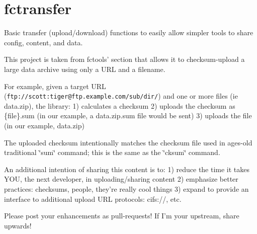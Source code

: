 \section*{fctransfer }

Basic transfer (upload/download) functions to easily allow simpler tools to share config, content, and data.

This project is taken from fctools' section that allows it to checksum-\/upload a large data archive using only a U\-R\-L and a filename.

For example, given a target U\-R\-L ({\tt ftp\-://scott\-:tiger@ftp.\-example.\-com/sub/dir/}) and one or more files (ie data.\-zip), the library\-: 1) calculates a checksum 2) uploads the checksum as \{file\}.sum (in our example, a data.\-zip.\-sum file would be sent) 3) uploads the file (in our example, data.\-zip)

The uploaded checksum intentionally matches the checksum file used in ages-\/old traditional \char`\"{}sum\char`\"{} command; this is the same as the \char`\"{}cksum\char`\"{} command.

An additional intention of sharing this content is to\-: 1) reduce the time it takes Y\-O\-U, the next developer, in uploading/sharing content 2) emphasize better practices\-: checksums, people, they're really cool things 3) expand to provide an interface to additional upload U\-R\-L protocols\-: cifs\-://, etc.

Please post your enhancements as pull-\/requests! If I'm your upstream, share upwards! 